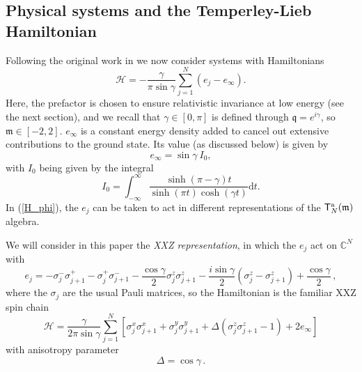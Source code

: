 \documentclass[a4paper,10pt]{article}
\newcommand{\q}{\mathfrak{q}}
\newcommand{\linnea}[1]{$\framebox{\tiny L}$\ \textbf{\texttt{{\color{red}\footnotesize#1}}}}
\newcommand{\ATL}[1]{\mathsf{T}^{\rm a}_{#1}}
\newcommand{\HN}{\mathcal{H}}
\newcommand{\m}{\mathfrak{m}}
\begin{document}
\subsection{Physical systems and the Temperley-Lieb Hamiltonian}

Following the original work in \cite{KooSaleur} we now consider systems with Hamiltonians
%
\begin{equation}\label{H_phi}
\HN = -\frac{\gamma}{\pi \sin \gamma} \sum^{N}_{j=1} (e_j-e_\infty) .
\end{equation}
%
Here, the prefactor is chosen to ensure relativistic invariance at low energy (see the next section), and we recall that $\gamma\in [0,\pi]$ is defined through $\q=e^{i\gamma}$, so $\m\in [-2,2]$.   $e_\infty$ is a constant energy density 
 added to cancel out extensive contributions to the ground state. Its value (as discussed below) is given by
%
\begin{equation}\label{e_inf}
e_\infty = \sin \gamma \: I_0,
\end{equation}
with $I_0$ being given by the integral 
\begin{equation} \label{I0-def}
I_0=\int^\infty_{-\infty} \frac{\sinh(\pi-\gamma)t }{\sinh(\pi t)\cosh(\gamma t)}\mathrm{d}t.
\end{equation}
%
In (\ref{H_phi}), the $e_j$ can be  taken to act in different representations of the $\ATL{N}(\m)$ algebra.

We will consider in this paper the {\em XXZ representation}, in which the $e_j$ act on $\mathbb{C}^{N}$ with 
%
\begin{equation}
e_j = -\sigma_j^{-}\sigma_{j+1}^{+}-\sigma_j^{+}\sigma_{j+1}^{-}
-\frac{\cos\gamma}{2}\sigma_j^{z}\sigma_{j+1}^{z} -\frac{i\sin\gamma}{2}(\sigma_j^{z}-\sigma_{j+1}^{z})+\frac{\cos\gamma}{2} \,,
\label{TLspin}
\end{equation}
%
where the $\sigma_j$ are the usual Pauli matrices, so the Hamiltonian is the familiar XXZ spin chain 
%
\begin{equation}\label{Pauliham}
\HN = \frac{\gamma}{2 \pi \sin \gamma}\sum^{N}_{j=1}   \left[ \sigma^x_j \sigma^x_{j+1} + \sigma^y_j \sigma^y_{j+1} + \Delta (\sigma^z_j \sigma^z_{j+1} - 1 ) + 2 e_\infty \right]
\end{equation}
%
with anisotropy parameter
%
\begin{equation} \label{anisotropydelta}
 \Delta = \cos \gamma \,.
\end{equation}
\end{document}
